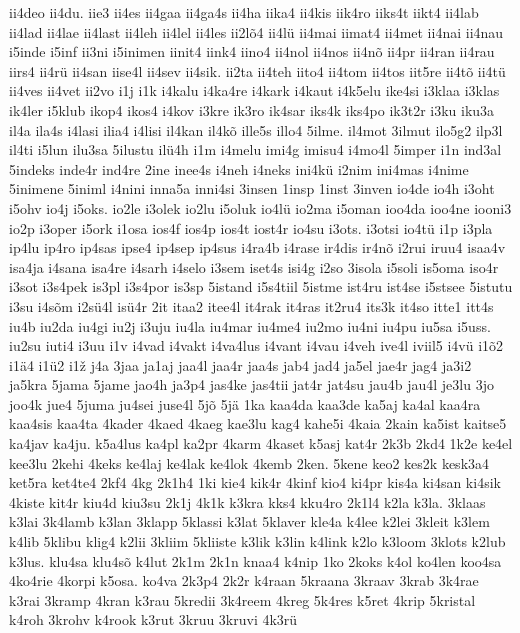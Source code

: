 {ii4deo
ii4du.
iie3
ii4es
ii4gaa
ii4ga4s
ii4ha
iika4
ii4kis
iik4ro
iiks4t
iikt4
ii4lab
ii4lad
ii4lae
ii4last
ii4leh
ii4lel
ii4les
ii2lõ4
ii4lü
ii4mai
iimat4
ii4met
ii4nai
ii4nau
i5inde
i5inf
ii3ni
i5inimen
iinit4
iink4
iino4
ii4nol
ii4nos
ii4nõ
ii4pr
ii4ran
ii4rau
iirs4
ii4rü
ii4san
iise4l
ii4sev
ii4sik.
ii2ta
ii4teh
iito4
ii4tom
ii4tos
iit5re
ii4tõ
ii4tü
ii4ves
ii4vet
ii2vo
i1j
i1k
i4kalu
i4ka4re
i4kark
i4kaut
i4k5elu
ike4si
i3klaa
i3klas
ik4ler
i5klub
ikop4
ikos4
i4kov
i3kre
ik3ro
ik4sar
iks4k
iks4po
ik3t2r
i3ku
iku3a
il4a
ila4s
i4lasi
ilia4
i4lisi
il4kan
il4kõ
ille5s
illo4
5ilme.
il4mot
3ilmut
ilo5g2
ilp3l
il4ti
i5lun
ilu3sa
5ilustu
ilü4h
i1m
i4melu
imi4g
imisu4
i4mo4l
5imper
i1n
ind3al
5indeks
inde4r
ind4re
2ine
inee4s
i4neh
i4neks
ini4kü
i2nim
ini4mas
i4nime
5inimene
5iniml
i4nini
inna5a
inni4si
3insen
1insp
1inst
3inven
io4de
io4h
i3oht
i5ohv
io4j
i5oks.
io2le
i3olek
io2lu
i5oluk
io4lü
io2ma
i5oman
ioo4da
ioo4ne
iooni3
io2p
i3oper
i5ork
i1osa
ios4f
ios4p
ios4t
iost4r
io4su
i3ots.
i3otsi
io4tü
i1p
i3pla
ip4lu
ip4ro
ip4sas
ipse4
ip4sep
ip4sus
i4ra4b
i4rase
ir4dis
ir4nõ
i2rui
iruu4
isaa4v
isa4ja
i4sana
isa4re
i4sarh
i4selo
i3sem
iset4s
isi4g
i2so
3isola
i5soli
is5oma
iso4r
i3sot
i3s4pek
is3pl
i3s4por
is3sp
5istand
i5s4tiil
5istme
ist4ru
ist4se
i5stsee
5istutu
i3su
i4sõm
i2sü4l
isü4r
2it
itaa2
itee4l
it4rak
it4ras
it2ru4
its3k
it4so
itte1
itt4s
iu4b
iu2da
iu4gi
iu2j
i3uju
iu4la
iu4mar
iu4me4
iu2mo
iu4ni
iu4pu
iu5sa
i5uss.
iu2su
iuti4
i3uu
i1v
i4vad
i4vakt
i4va4lus
i4vant
i4vau
i4veh
ive4l
iviil5
i4vü
i1õ2
i1ä4
i1ü2
i1ž
j4a
3jaa
ja1aj
jaa4l
jaa4r
jaa4s
jab4
jad4
ja5el
jae4r
jag4
ja3i2
ja5kra
5jama
5jame
jao4h
ja3p4
jas4ke
jas4tii
jat4r
jat4su
jau4b
jau4l
je3lu
3jo
joo4k
jue4
5juma
ju4sei
juse4l
5jõ
5jä
1ka
kaa4da
kaa3de
ka5aj
ka4al
kaa4ra
kaa4sis
kaa4ta
4kader
4kaed
4kaeg
kae3lu
kag4
kahe5i
4kaia
2kain
ka5ist
kaitse5
ka4jav
ka4ju.
k5a4lus
ka4pl
ka2pr
4karm
4kaset
k5asj
kat4r
2k3b
2kd4
1k2e
ke4el
kee3lu
2kehi
4keks
ke4laj
ke4lak
ke4lok
4kemb
2ken.
5kene
keo2
kes2k
kesk3a4
ket5ra
ket4te4
2kf4
4kg
2k1h4
1ki
kie4
kik4r
4kinf
kio4
ki4pr
kis4a
ki4san
ki4sik
4kiste
kit4r
kiu4d
kiu3su
2k1j
4k1k
k3kra
kks4
kku4ro
2k1l4
k2la
k3la.
3klaas
k3lai
3k4lamb
k3lan
3klapp
5klassi
k3lat
5klaver
kle4a
k4lee
k2lei
3kleit
k3lem
k4lib
5klibu
klig4
k2lii
3kliim
5kliiste
k3lik
k3lin
k4link
k2lo
k3loom
3klots
k2lub
k3lus.
klu4sa
klu4sõ
k4lut
2k1m
2k1n
knaa4
k4nip
1ko
2koks
k4ol
ko4len
koo4sa
4ko4rie
4korpi
k5osa.
ko4va
2k3p4
2k2r
k4raan
5kraana
3kraav
3krab
3k4rae
k3rai
3kramp
4kran
k3rau
5kredii
3k4reem
4kreg
5k4res
k5ret
4krip
5kristal
k4roh
3krohv
k4rook
k3rut
3kruu
3kruvi
4k3rü
}
